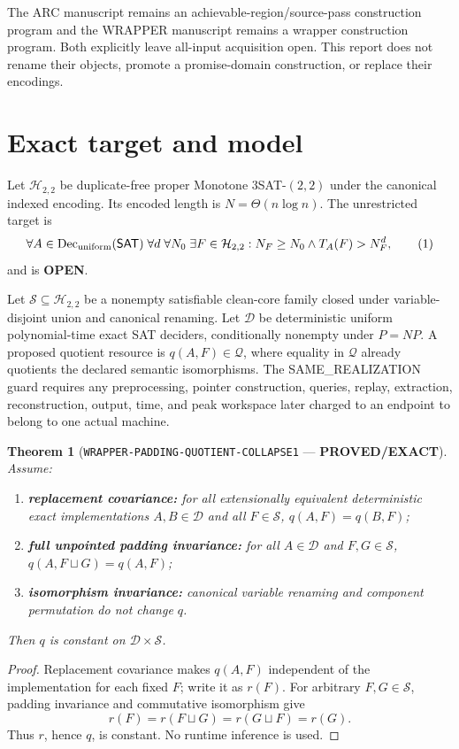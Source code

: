 \documentclass[11pt]{article}
\newtheorem{theorem}{Theorem}
\newcommand{\SAT}{\mathsf{SAT}}
\newcommand{\EXACT}{\textbf{PROVED/EXACT}}
\newcommand{\OPEN}{\textbf{OPEN}}
\begin{document}
The ARC manuscript remains an achievable-region/source-pass construction
program and the WRAPPER manuscript remains a wrapper construction program.
Both explicitly leave all-input acquisition open.  This report does not
rename their objects, promote a promise-domain construction, or replace their
encodings.

\section{Exact target and model}
Let \(\mathcal H_{2,2}\) be duplicate-free proper Monotone
\(3\)SAT-\((2,2)\) under the canonical indexed encoding.  Its encoded length
is \(N=\Theta(n\log n)\).  The unrestricted target is
\[
 \forall A\in\operatorname{Dec}_{\rm uniform}(\SAT)\;
 \forall d\;\forall N_0\;\exists F\in\mathcal H_{2,2}:
 N_F\ge N_0\land T_A(F)>N_F^d,                         \tag{1}
\]
and is \OPEN.

Let \(\mathcal S\subseteq\mathcal H_{2,2}\) be a nonempty satisfiable
clean-core family closed under variable-disjoint union and canonical
renaming.  Let \(\mathcal D\) be deterministic uniform polynomial-time exact
SAT deciders, conditionally nonempty under \(P=NP\).  A proposed quotient
resource is \(q(A,F)\in\mathcal Q\), where equality in \(\mathcal Q\) already
quotients the declared semantic isomorphisms.  The SAME\_REALIZATION guard
requires any preprocessing, pointer construction, queries, replay, extraction,
reconstruction, output, time, and peak workspace later charged to an endpoint
to belong to one actual machine.

\begin{theorem}[\texttt{WRAPPER-PADDING-QUOTIENT-COLLAPSE1} --- \EXACT]
Assume:
\begin{enumerate}[leftmargin=1.7em]
\item \textbf{replacement covariance:} for all extensionally equivalent
deterministic exact implementations \(A,B\in\mathcal D\) and all
\(F\in\mathcal S\), \(q(A,F)=q(B,F)\);
\item \textbf{full unpointed padding invariance:} for all
\(A\in\mathcal D\) and \(F,G\in\mathcal S\),
\(q(A,F\sqcup G)=q(A,F)\);
\item \textbf{isomorphism invariance:} canonical variable renaming and
component permutation do not change \(q\).
\end{enumerate}
Then \(q\) is constant on \(\mathcal D\times\mathcal S\).
\end{theorem}

\begin{proof}
Replacement covariance makes \(q(A,F)\) independent of the implementation
for each fixed \(F\); write it as \(r(F)\).  For arbitrary
\(F,G\in\mathcal S\), padding invariance and commutative isomorphism give
\[
 r(F)=r(F\sqcup G)=r(G\sqcup F)=r(G).
\]
Thus \(r\), hence \(q\), is constant.  No runtime inference is used.
\end{proof}
\end{document}
